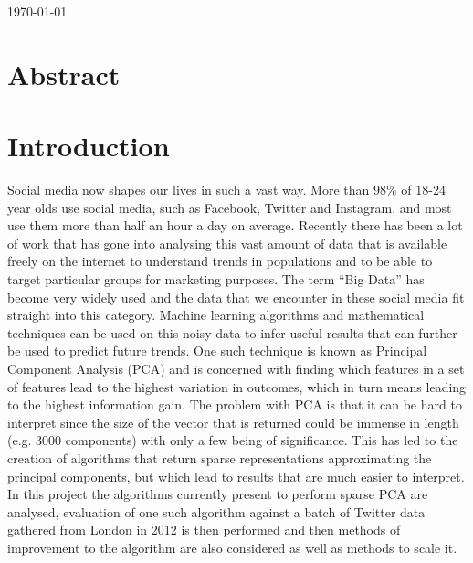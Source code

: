 \documentclass[11pt,a4paper]{article}
\begin{document}
\begin{titlepage}

{\large \today}\\[3cm] %

\vfill %

\end{titlepage}





\newpage




\section*{\center Abstract}

\clearpage
{}

\section{Introduction}
Social media now shapes our lives in such a vast way. More than $98\%$ of 18-24 year olds use social media, such as Facebook, Twitter and Instagram, and most use them more than half an hour a day on average\cite{statbrain}. Recently there has been a lot of work that has gone into analysing this vast amount of data that is available freely on the internet to understand trends in populations and to be able to target particular groups for marketing purposes. The term ``Big Data'' has become very widely used and the data that we encounter in these social media fit straight into this category. Machine learning algorithms and mathematical techniques can be used on this noisy data to infer useful results that can further be used to predict future trends. 
One such technique is known as Principal Component Analysis (PCA) and is concerned with finding which features in a set of features lead to the highest variation in outcomes, which in turn means leading to the highest information gain. The problem with PCA is that it can be hard to interpret since the size of the vector that is returned could be immense in length (e.g. 3000 components) with only a few being of significance. This has led to the creation of algorithms that return sparse representations approximating the principal components, but which lead to results that are much easier to interpret. In this project the algorithms currently present to perform sparse PCA are analysed, evaluation of one such algorithm against a batch of Twitter data gathered from London in 2012 is then performed and then methods of improvement to the algorithm are also considered as well as methods to scale it. 
\end{document}
